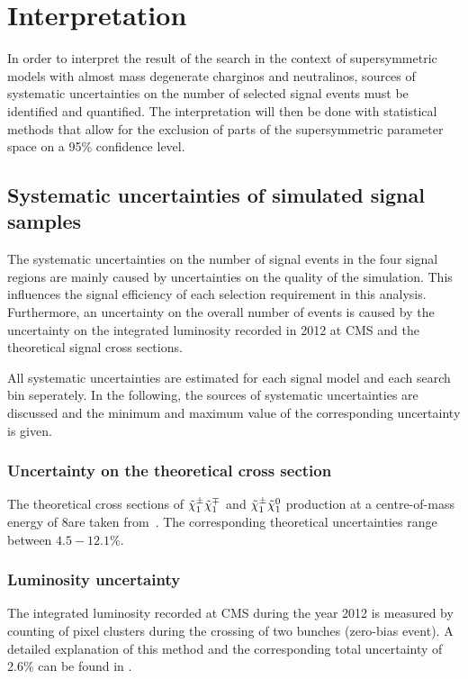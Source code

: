 \FloatBarrier
\chapter{Interpretation}
\label{sec:Interpretation}
In order to interpret the result of the search in the context of supersymmetric models with almost mass degenerate charginos and neutralinos, sources of systematic uncertainties on the number of selected signal events must be identified and quantified.
The interpretation will then be done with statistical methods that allow for the exclusion of parts of the supersymmetric parameter space on a 95\% confidence level.

\section{Systematic uncertainties of simulated signal samples}
The systematic uncertainties on the number of signal events in the four signal regions are mainly caused by uncertainties on the quality of the simulation.
This influences the signal efficiency of each selection requirement in this analysis.
Furthermore, an uncertainty on the overall number of events is caused by the uncertainty on the integrated luminosity recorded in 2012 at CMS and the theoretical signal cross sections.

All systematic uncertainties are estimated for each signal model and each search bin seperately.
In the following, the sources of systematic uncertainties are discussed and the minimum and maximum value of the corresponding uncertainty is given.

\subsection*{Uncertainty on the theoretical cross section}
The theoretical cross sections of $\tilde{\chi}^{\pm}_{1}\tilde{\chi}^{\mp}_{1}$ and $\tilde{\chi}^{\pm}_{1}\tilde{\chi}^{0}_{1}$ production at a centre-of-mass energy of 8\tev are taken from~\cite{bib:SignalCrossSection_2012,bib:SignalCrossSection_2013}.
The corresponding theoretical uncertainties range between $4.5-12.1\%$.

\subsection*{Luminosity uncertainty}
The integrated luminosity recorded at CMS during the year 2012 is measured by counting of pixel clusters during the crossing of two bunches (zero-bias event).
A detailed explanation of this method and the corresponding total uncertainty of 2.6\% can be found in \cite{bib:CMS:Lumi_PAS}.

